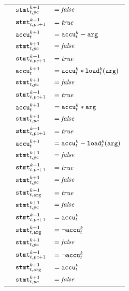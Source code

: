 \begin{longtabu}{llX[m]}
    & $\texttt{stmt}^{k + 1}_{t, pc}$     & $= \textit{false}$ \\
    & $\texttt{stmt}^{k + 1}_{t, pc + 1}$ & $= \textit{true}$ \\
  \hline
    & $\texttt{accu}^{k + 1}_t$           & $= \texttt{accu}^k_t - \texttt{arg}$ \\
    & $\texttt{stmt}^{k + 1}_{t, pc}$     & $= \textit{false}$ \\
    & $\texttt{stmt}^{k + 1}_{t, pc + 1}$ & $= \textit{true}$ \\
  \hline
    & $\texttt{accu}^{k + 1}_t$           & $= \texttt{accu}^k_t * \texttt{load}^k_t(\texttt{arg})$ \\
    & $\texttt{stmt}^{k + 1}_{t, pc}$     & $= \textit{false}$ \\
    & $\texttt{stmt}^{k + 1}_{t, pc + 1}$ & $= \textit{true}$ \\
  \hline
  \newpage
  \hline
    & $\texttt{accu}^{k + 1}_t$           & $= \texttt{accu}^k_t * \texttt{arg}$ \\
    & $\texttt{stmt}^{k + 1}_{t, pc}$     & $= \textit{false}$ \\
    & $\texttt{stmt}^{k + 1}_{t, pc + 1}$ & $= \textit{true}$ \\
  \hline
    & $\texttt{accu}^{k + 1}_t$           & $= \texttt{accu}^k_t - \texttt{load}^k_t(\texttt{arg})$ \\
    & $\texttt{stmt}^{k + 1}_{t, pc}$     & $= \textit{false}$ \\
    & $\texttt{stmt}^{k + 1}_{t, pc + 1}$ & $= \textit{true}$ \\
  \hline
    & $\texttt{stmt}^{k + 1}_{t, pc}$           & $= \textit{false}$ \\
    & $\texttt{stmt}^{k + 1}_{t, \texttt{arg}}$ & $= \textit{true}$ \\
  \hline
    & $\texttt{stmt}^{k + 1}_{t, pc}$           & $= \textit{false}$ \\
    & $\texttt{stmt}^{k + 1}_{t, pc + 1}$       & $= \texttt{accu}^k_t$ \\
    & $\texttt{stmt}^{k + 1}_{t, \texttt{arg}}$ & $= \lnot \texttt{accu}^k_t$ \\
  \hline
    & $\texttt{stmt}^{k + 1}_{t, pc}$           & $= \textit{false}$ \\
    & $\texttt{stmt}^{k + 1}_{t, pc + 1}$       & $= \lnot \texttt{accu}^k_t$ \\
    & $\texttt{stmt}^{k + 1}_{t, \texttt{arg}}$ & $= \texttt{accu}^k_t$ \\
  \hline
    & $\texttt{stmt}^{k + 1}_{t, pc}$           & $= \textit{false}$ \\

\end{longtabu}
